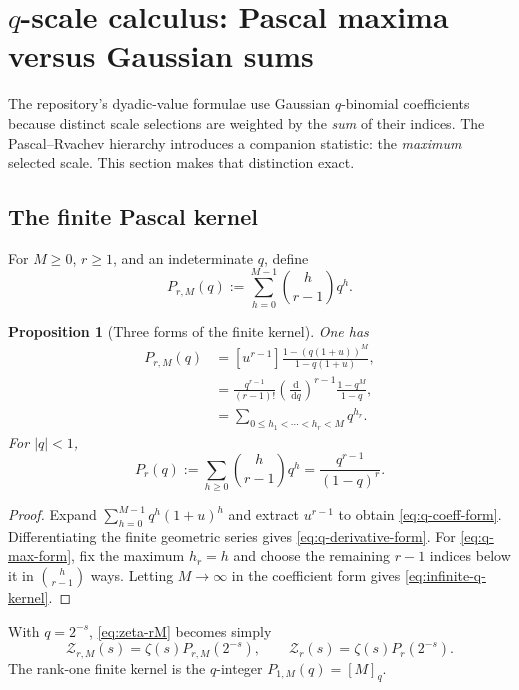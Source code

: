 \documentclass[11pt,a4paper]{article}
\theoremstyle{frontier}
\newtheorem{proposition}[theorem]{Proposition}
\theoremstyle{definition}
\newcommand{\dd}{\,\mathrm d}
\begin{document}
\section{\texorpdfstring{$q$}{q}-scale calculus: Pascal maxima versus Gaussian sums}\label{sec:qcalculus}

The repository's dyadic-value formulae use Gaussian $q$-binomial coefficients because distinct scale selections are weighted by the \emph{sum} of their indices.  The Pascal--Rvachev hierarchy introduces a companion statistic: the \emph{maximum} selected scale.  This section makes that distinction exact.

\subsection{The finite Pascal kernel}

For $M\ge0$, $r\ge1$, and an indeterminate $q$, define
\begin{equation}\label{eq:pascal-q-kernel}
  P_{r,M}(q):=\sum_{h=0}^{M-1}\binom h{r-1}q^h.
\end{equation}

\begin{proposition}[Three forms of the finite kernel]\label{prop:finite-q-kernel}
One has
\begin{align}
 P_{r,M}(q)
 &= [u^{r-1}]\frac{1-(q(1+u))^M}{1-q(1+u)},\label{eq:q-coeff-form}\\
 &=\frac{q^{r-1}}{(r-1)!}
   \left(\frac{\dd}{\dd q}\right)^{r-1}
   \frac{1-q^M}{1-q},\label{eq:q-derivative-form}\\
 &=\sum_{0\le h_1<\cdots<h_r<M}q^{h_r}.\label{eq:q-max-form}
\end{align}
For $|q|<1$,
\begin{equation}\label{eq:infinite-q-kernel}
  P_r(q):=\sum_{h\ge0}\binom h{r-1}q^h
  =\frac{q^{r-1}}{(1-q)^r}.
\end{equation}
\end{proposition}

\begin{proof}
Expand
$\sum_{h=0}^{M-1}q^h(1+u)^h$ and extract $u^{r-1}$ to obtain \eqref{eq:q-coeff-form}.  Differentiating the finite geometric series gives \eqref{eq:q-derivative-form}.  For \eqref{eq:q-max-form}, fix the maximum $h_r=h$ and choose the remaining $r-1$ indices below it in $\binom h{r-1}$ ways.  Letting $M\to\infty$ in the coefficient form gives \eqref{eq:infinite-q-kernel}.
\end{proof}

With $q=2^{-s}$, \eqref{eq:zeta-rM} becomes simply
\begin{equation}\label{eq:zeta-q-kernel}
  \mathcal Z_{r,M}(s)=\zeta(s)P_{r,M}(2^{-s}),
  \qquad
  \mathcal Z_r(s)=\zeta(s)P_r(2^{-s}).
\end{equation}
The rank-one finite kernel is the $q$-integer $P_{1,M}(q)=[M]_q$.
\end{document}

